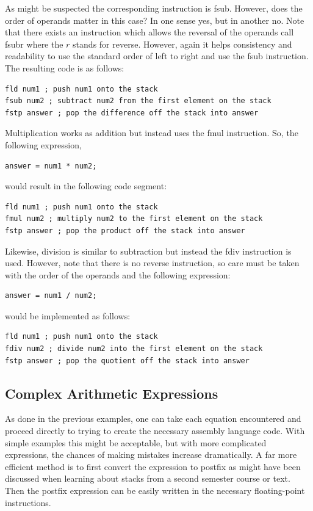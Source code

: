 \documentclass[10pt]{article}
\begin{document}
As might be suspected the corresponding instruction is fsub. However, does the order of operands matter in this case? In one sense yes, but in another no. Note that there exists an instruction which allows the reversal of the operands call fsubr where the $r$ stands for reverse. However, again it helps consistency and readability to use the standard order of left to right and use the fsub instruction. The resulting code is as follows:

\begin{verbatim}
fld num1 ; push num1 onto the stack
fsub num2 ; subtract num2 from the first element on the stack
fstp answer ; pop the difference off the stack into answer
\end{verbatim}

Multiplication works as addition but instead uses the fmul instruction. So, the following expression,

\begin{verbatim}
answer = num1 * num2;
\end{verbatim}

would result in the following code segment:

\begin{verbatim}
fld num1 ; push num1 onto the stack
fmul num2 ; multiply num2 to the first element on the stack
fstp answer ; pop the product off the stack into answer
\end{verbatim}

Likewise, division is similar to subtraction but instead the fdiv instruction is used. However, note that there is no reverse instruction, so care must be taken with the order of the operands and the following expression:

\begin{verbatim}
answer = num1 / num2;
\end{verbatim}

would be implemented as follows:

\begin{verbatim}
fld num1 ; push num1 onto the stack
fdiv num2 ; divide num2 into the first element on the stack
fstp answer ; pop the quotient off the stack into answer
\end{verbatim}

\subsection*{Complex Arithmetic Expressions}
As done in the previous examples, one can take each equation encountered and proceed directly to trying to create the necessary assembly language code. With simple examples this might be acceptable, but with more complicated expressions, the chances of making mistakes increase dramatically. A far more efficient method is to first convert the expression to postfix as might have been discussed when learning about stacks from a second semester course or text. Then the postfix expression can be easily written in the necessary floating-point instructions.
\end{document}
